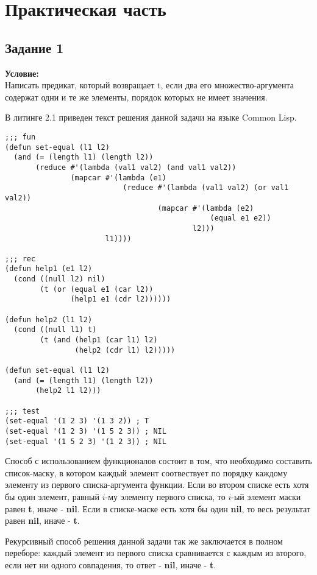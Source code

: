 \chapter{Практическая часть}

\lstset{language=lisp}

\section{Задание \No{}1}
\textbf{Условие:}\\Написать предикат, который возвращает t, если два его множество-аргумента содержат одни и те же элементы, порядок которых не имеет значения.

В литинге 2.1 приведен текст решения данной задачи на языке Common Lisp.

\begin{lstlisting}[caption={Задание \No{}1}]
;;; fun
(defun set-equal (l1 l2)
  (and (= (length l1) (length l2))
       (reduce #'(lambda (val1 val2) (and val1 val2))
               (mapcar #'(lambda (e1)
                           (reduce #'(lambda (val1 val2) (or val1 val2))
                                   (mapcar #'(lambda (e2)
                                               (equal e1 e2))
                                           l2)))
                       l1))))

;;; rec
(defun help1 (e1 l2)
  (cond ((null l2) nil)
        (t (or (equal e1 (car l2))
               (help1 e1 (cdr l2))))))

(defun help2 (l1 l2)
  (cond ((null l1) t)
        (t (and (help1 (car l1) l2)
                (help2 (cdr l1) l2)))))

(defun set-equal (l1 l2)
  (and (= (length l1) (length l2))
       (help2 l1 l2)))

;;; test
(set-equal '(1 2 3) '(1 3 2)) ; T
(set-equal '(1 2 3) '(1 5 2 3)) ; NIL
(set-equal '(1 5 2 3) '(1 2 3)) ; NIL
\end{lstlisting}

Способ с использованием функционалов состоит в том, что необходимо составить список-маску, в котором каждый элемент соотвествует по порядку каждому элементу из первого списка-аргумента функции. Если во втором списке есть хотя бы один элемент, равный $i$-му элементу первого списка, то $i$-ый элемент маски равен \textbf{t}, иначе - \textbf{nil}. Если в списке-маске есть хотя бы один \textbf{nil}, то весь результат равен \textbf{nil}, иначе -  \textbf{t}.

Рекурсивный способ решения данной задачи так же заключается в полном переборе: каждый элемент из первого списка сравнивается с каждым из второго, если нет ни одного совпадения, то ответ - \textbf{nil}, иначе - \textbf{t}.

